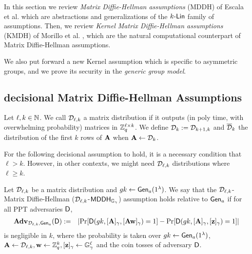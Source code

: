 In this section we review \emph{Matrix Diffie-Hellman assumptions} (MDDH) of Escala et al. \cite{C:EHKRV13} which are abstractions and generalizations of the $k\mbox{-}\mathsf{Lin}$ family of assumptions. Then, we review \emph{Kernel Matrix Diffie-Hellman assumptions} (KMDH) of Morillo et al. \cite{EPRINT:MorRafVil15}, which are the natural computational counterpart of Matrix Diffie-Hellman assumptions.

We also put forward a new Kernel assumption which is specific to asymmetric groups, and we prove its security in the \emph{generic group model}.

\subsection{decisional Matrix Diffie-Hellman Assumptions}
\begin{definition}   \label{def:matrixdef}
Let $\ell,k \in \mathbb{N}$.
We call $\mathcal{D}_{\ell,k}$ a matrix distribution if it outputs (in poly time, with overwhelming probability) matrices in $\mathbb{Z}_q^{\ell \times k}$. We define $\mathcal{D}_k := \mathcal{D}_{k+1,k}$ and $\overline{\mathcal{D}}_{k}$ the distribution of the first $k$ rows of $\mathbf{{A}}$ when $\mathbf{{A}}\gets\mathcal{D}_{k}$. 
\end{definition}

For the following decisional assumption to hold, it is a necessary condition that $\ell>k$. However, in other contexts, we might need $\mathcal{D}_{\ell,k}$ distributions where 
$\ell \geq k$. 

\begin{definition}\label{def:mdh}
Let $\mathcal{D}_{\ell,k}$ be a matrix distribution  and ${gk}\gets \mathsf{Gen}_a(1^\lambda)$. We say that the $\mathcal{D}_{\ell,k}$-Matrix Diffie-Hellman ($\mathcal{D}_{\ell,k}$-$\mathsf{MDDH}_{\mathbb{G}_\gamma}$)
assumption holds relative to $\mathsf{Gen}_a$ if for all PPT adversaries $\mathsf{D}$,
\begin{eqnarray*}
\mathbf{Adv}_{\mathcal{D}_{\ell,k},\mathsf{Gen}_a}(\mathsf{D}) & := &
    \left|
        \Pr[\mathsf{D}({gk},[\mathbf{{A}}]_\gamma,[\mathbf{{A}}\mathbf{w}]_\gamma)=1]-
        \Pr[\mathsf{D}({gk},[\mathbf{{A}}]_\gamma, [\mathbf{z}]_\gamma) =1]
    \right|
\end{eqnarray*}
is negligible in $k$,
where the probability is taken over ${gk} \gets \mathsf{Gen}_a(1^\lambda)$, $\mathbf{{A}} \gets \mathcal{D}_{\ell,k}, \mathbf{w} \gets \mathbb{Z}_q^k, [\mathbf{z}]_\gamma  \gets \mathbb{G}_\gamma^{\ell}$ and the coin tosses of adversary $\mathsf{D}$.
\end{definition}
 
